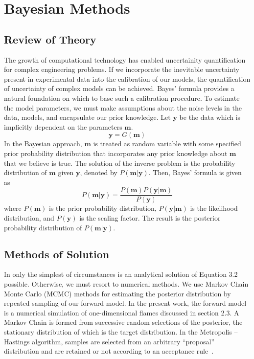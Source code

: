 \chapter{Bayesian Methods}\label{chap:bayes}
\section{Review of Theory}

The growth of computational technology has enabled uncertainity
quantification for complex engineering problems. If we incorporate the
inevitable uncertainty present in experimental
data into the calibration of our models, the quantification of
uncertainty of complex models can be
achieved. Bayes' formula provides a natural foundation on which to
base such a calibration procedure.
To estimate the model parameters, we must make
assumptions about the noise levels in the data, models, and
encapsulate our prior knowledge. Let
$\mathbf{y}$ be the data which is implicitly dependent on the parameters $\mathbf{m}$.
%
\begin{equation}
  \mathbf{y} = G(\mathbf{m})
\end{equation}
%
  In the Bayesian approach, $\mathbf{m}$ is treated as random variable with some
  specified prior probability distribution that incorporates any prior
  knowledge about $\mathbf{m}$ that we believe is true. The solution of the inverse problem is the
  probability distribution of $\mathbf{m}$ given $\mathbf{y}$, denoted by $P(\mathbf{m}|\mathbf{y})$. Then, Bayes'
  formula is given as~\cite{Sivia}
  \begin{equation}
    P(\mathbf{m}|\mathbf{y}) = \frac{P(\mathbf{m}) P(\mathbf{y}|\mathbf{m})}{P(\mathbf{y})}
  \end{equation}
%
 where $P(\mathbf{m})$ is the prior probability distribution, $P(\mathbf{y}|\mathbf{m})$
 is the likelihood distribution, and $P(\mathbf{y})$ is the scaling factor.
 The result is the posterior probability distribution of $P(\mathbf{m}|\mathbf{y})$.

\section{Methods of Solution}

In only the simplest of circumstances is an analytical solution of Equation 3.2
possible. Otherwise, we must resort to numerical methods.
 We use Markov Chain Monte Carlo (MCMC) methods for estimating the posterior
 distribution by repeated sampling of our forward model. In the
 present work, the forward model is a numerical simulation of
 one-dimensional flames discussed in section 2.3. A Markov Chain is formed from successive
 random selections of the posterior, the stationary distribution of which is the target
 distribution. In the Metropolis – Hastings algorithm, samples are
 selected from an arbitrary “proposal” distribution and are retained
 or not according to an acceptance rule~\cite{RobertCasella2004}.

